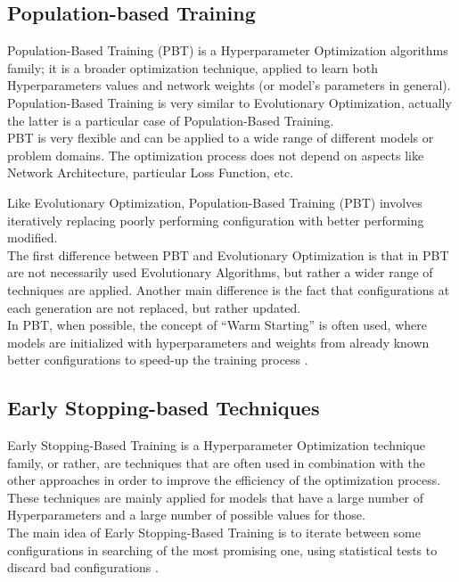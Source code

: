 \subsection{Population-based Training}

Population-Based Training (PBT) is a Hyperparameter Optimization algorithms family; it is a broader optimization technique, applied to learn both Hyperparameters values and network weights (or model's parameters in general).
\\[0.3cm]Population-Based Training is very similar to Evolutionary Optimization, actually the latter is a particular case of Population-Based Training.
\\[0.3cm]PBT is very flexible and can be applied to a wide range of different models or problem domains. The optimization process does not depend on aspects like Network Architecture, particular Loss Function, etc.

Like Evolutionary Optimization, Population-Based Training (PBT) involves iteratively replacing poorly performing configuration with better performing modified.
\\[0.3cm]The first difference between PBT and Evolutionary Optimization is that in PBT are not necessarily used Evolutionary Algorithms, but rather a wider range of techniques are applied.
Another main difference is the fact that configurations at each generation are not replaced, but rather updated.
\\[0.3cm]In PBT, when possible, the concept of “Warm Starting” is often used, where models are initialized with hyperparameters and weights from already known better configurations to speed-up the training process \cite{Tesi-1.1}.

\subsection{Early Stopping-based Techniques}

Early Stopping-Based Training is a Hyperparameter Optimization technique family, or rather, are techniques that are often used in combination with the other approaches in order to improve the efficiency of the optimization process.
\\[0.3cm]These techniques are mainly applied for models that have a large number of Hyperparameters and a large number of possible values for those.
\\[0.3cm]The main idea of Early Stopping-Based Training is to iterate between some configurations in searching of the most promising one, using statistical tests to discard bad configurations \cite{Tesi-1.3}.

